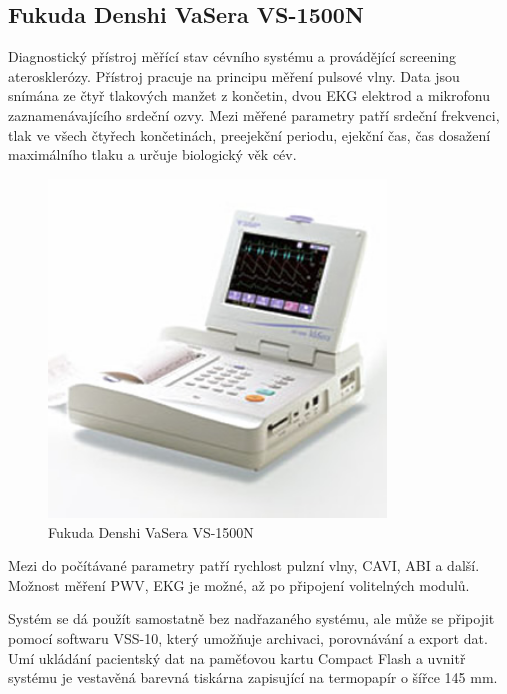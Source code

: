 \subsection{Fukuda Denshi VaSera VS-1500N}
Diagnostický přístroj měřící stav cévního systému a provádějící screening aterosklerózy. Přístroj pracuje na principu měření pulsové vlny. Data jsou snímána ze čtyř tlakových manžet z končetin, dvou EKG elektrod a mikrofonu zaznamenávajícího srdeční ozvy.
Mezi měřené parametry patří srdeční frekvenci, tlak ve všech čtyřech končetinách, preejekční periodu, ejekční čas, čas dosažení maximálního tlaku a určuje biologický věk cév.\cite{cite:Vasera}
\begin{figure}[H]
    \caption{Fukuda Denshi VaSera VS-1500N \cite{cite:Vasera}}
    \includegraphics[width=0.8\textwidth]{pictures/vs_1500n.jpg}
\end{figure}
Mezi do počítávané parametry patří rychlost pulzní vlny, CAVI, ABI a další. Možnost měření PWV, EKG je možné, až po připojení volitelných modulů.\cite{cite:Vasera}
\par
Systém se dá použít samostatně bez nadřazaného systému, ale může se připojit pomocí softwaru VSS-10, který umožňuje archivaci, porovnávání a export dat. Umí ukládání pacientský dat na paměťovou kartu Compact Flash a uvnitř systému je
vestavěná barevná tiskárna zapisující na termopapír o šířce 145 mm.\cite{cite:Vasera}
